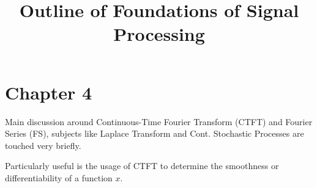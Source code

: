 \documentclass{article}
\begin{document}
\title{\bf Outline of Foundations of Signal Processing}
\maketitle
\section*{Chapter 4}
Main discussion around Continuous-Time Fourier Transform (CTFT) and Fourier Series (FS), subjects like Laplace Transform and Cont. Stochastic Processes are touched very briefly.

Particularly useful is the usage of CTFT to determine the smoothness or differentiability of a function $x$.
\end{document}
